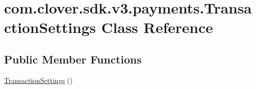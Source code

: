 \hypertarget{classcom_1_1clover_1_1sdk_1_1v3_1_1payments_1_1_transaction_settings}{}\section{com.\+clover.\+sdk.\+v3.\+payments.\+Transaction\+Settings Class Reference}
\label{classcom_1_1clover_1_1sdk_1_1v3_1_1payments_1_1_transaction_settings}
\subsection*{Public Member Functions}
\begin{DoxyCompactItemize}
\item 
\hyperlink{classcom_1_1clover_1_1sdk_1_1v3_1_1payments_1_1_transaction_settings_a60963148825d25c12a9fdde2101c52ba}{Transaction\+Settings} ()
\end{DoxyCompactItemize}
